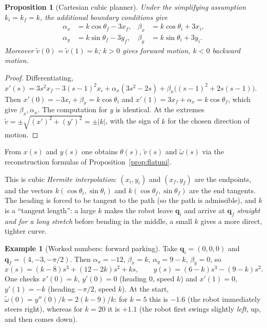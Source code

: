 \documentclass[11pt,a4paper]{article}
\newcommand{\qi}{\boldsymbol{q}_i}
\newcommand{\qf}{\boldsymbol{q}_f}
\newcommand{\vt}{\tilde v}
\newcommand{\wt}{\tilde\omega}
\theoremstyle{definition}
\newtheorem{example}[definition]{Example}
\theoremstyle{plain}
\newtheorem{proposition}[definition]{Proposition}
\theoremstyle{remark}
\begin{document}
\begin{proposition}[Cartesian cubic planner]\label{prop:cart}
Under the simplifying assumption $k_i=k_f=k$, the additional boundary conditions give
\begin{equation}
\begin{aligned}
\alpha_x&=k\cos\theta_f-3x_f, & \beta_x&=k\cos\theta_i+3x_i,\\
\alpha_y&=k\sin\theta_f-3y_f, & \beta_y&=k\sin\theta_i+3y_i.
\end{aligned}
\end{equation}
Moreover $\vt(0)=\vt(1)=k$; $k>0$ gives forward motion, $k<0$ backward motion.
\end{proposition}
\begin{proof}
Differentiating,
$x'(s)=3s^2x_f-3(s-1)^2x_i+\alpha_x(3s^2-2s)+\beta_x\big((s-1)^2+2s(s-1)\big)$. Then $x'(0)=-3x_i+\beta_x=k\cos\theta_i$ and
$x'(1)=3x_f+\alpha_x=k\cos\theta_f$, which give $\beta_x,\alpha_x$. The computation for $y$ is identical. At the extremes
$\vt=\pm\sqrt{(x')^2+(y')^2}=\pm|k|$, with the sign of $k$ for the chosen direction of motion. \qedhere
\end{proof}

From $x(s)$ and $y(s)$ one obtains $\theta(s)$, $\vt(s)$ and $\wt(s)$ via the reconstruction formulas of
Proposition~\ref{prop:flatuni}.

\begin{intuition}
This is cubic \emph{Hermite interpolation}: $(x_i,y_i)$ and $(x_f,y_f)$ are the endpoints, and the vectors
$k(\cos\theta_i,\sin\theta_i)$ and $k(\cos\theta_f,\sin\theta_f)$ are the end tangents. The heading is forced to be tangent to
the path (so the path is admissible), and $k$ is a ``tangent length'': a large $k$ makes the robot leave $\qi$ and arrive at
$\qf$ \emph{straight and for a long stretch} before bending in the middle, a small $k$ gives a more direct, tighter curve.
\end{intuition}

\begin{example}[Worked numbers: forward parking]\label{ex:fwd}
Take $\qi=(0,0,0)$ and $\qf=(4,-3,-\pi/2)$. Then $\alpha_x=-12$, $\beta_x=k$, $\alpha_y=9-k$, $\beta_y=0$, so
\[
x(s)=(k-8)s^3+(12-2k)s^2+ks,\qquad y(s)=(6-k)s^3-(9-k)s^2 .
\]
One checks $x'(0)=k$, $y'(0)=0$ (heading $0$, speed $k$) and $x'(1)=0$, $y'(1)=-k$ (heading $-\pi/2$, speed $k$).
At the start, $\wt(0)=y''(0)/k=2(k-9)/k$: for $k=5$ this is $-1.6$ (the robot immediately steers right), whereas for $k=20$ it is
$+1.1$ (the robot first swings slightly \emph{left}, up, and then comes down).
\end{example}
\end{document}
